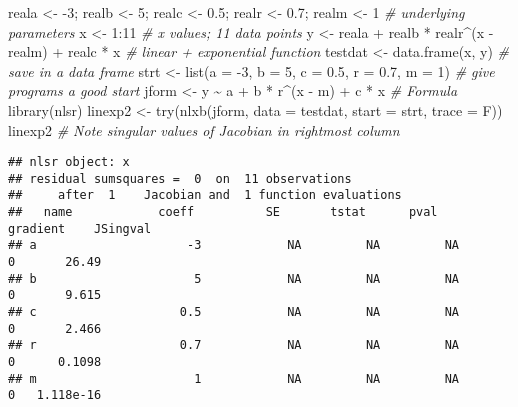 \documentclass[
]{article}
\newenvironment{Shaded}{\begin{snugshade}}{\end{snugshade}}
\newcommand{\AttributeTok}[1]{\textcolor[rgb]{0.77,0.63,0.00}{#1}}
\newcommand{\CommentTok}[1]{\textcolor[rgb]{0.56,0.35,0.01}{\textit{#1}}}
\newcommand{\DecValTok}[1]{\textcolor[rgb]{0.00,0.00,0.81}{#1}}
\newcommand{\FloatTok}[1]{\textcolor[rgb]{0.00,0.00,0.81}{#1}}
\newcommand{\FunctionTok}[1]{\textcolor[rgb]{0.00,0.00,0.00}{#1}}
\newcommand{\NormalTok}[1]{#1}
\newcommand{\OtherTok}[1]{\textcolor[rgb]{0.56,0.35,0.01}{#1}}
\newcommand{\SpecialCharTok}[1]{\textcolor[rgb]{0.00,0.00,0.00}{#1}}
\begin{document}
\begin{Shaded}
\begin{Highlighting}[]
\NormalTok{reala }\OtherTok{\textless{}{-}} \SpecialCharTok{{-}}\DecValTok{3}\NormalTok{; realb }\OtherTok{\textless{}{-}} \DecValTok{5}\NormalTok{; realc }\OtherTok{\textless{}{-}} \FloatTok{0.5}\NormalTok{; realr }\OtherTok{\textless{}{-}} \FloatTok{0.7}\NormalTok{; realm }\OtherTok{\textless{}{-}} \DecValTok{1} \CommentTok{\# underlying parameters}
\NormalTok{x }\OtherTok{\textless{}{-}} \DecValTok{1}\SpecialCharTok{:}\DecValTok{11} \CommentTok{\# x values; 11 data points}
\NormalTok{y }\OtherTok{\textless{}{-}}\NormalTok{ reala }\SpecialCharTok{+}\NormalTok{ realb }\SpecialCharTok{*}\NormalTok{ realr}\SpecialCharTok{\^{}}\NormalTok{(x }\SpecialCharTok{{-}}\NormalTok{ realm) }\SpecialCharTok{+}\NormalTok{ realc }\SpecialCharTok{*}\NormalTok{ x }\CommentTok{\# linear + exponential function}
\NormalTok{testdat }\OtherTok{\textless{}{-}} \FunctionTok{data.frame}\NormalTok{(x, y) }\CommentTok{\# save in a data frame}
\NormalTok{strt }\OtherTok{\textless{}{-}} \FunctionTok{list}\NormalTok{(}\AttributeTok{a =} \SpecialCharTok{{-}}\DecValTok{3}\NormalTok{, }\AttributeTok{b =} \DecValTok{5}\NormalTok{, }\AttributeTok{c =} \FloatTok{0.5}\NormalTok{, }\AttributeTok{r =} \FloatTok{0.7}\NormalTok{, }\AttributeTok{m =} \DecValTok{1}\NormalTok{) }\CommentTok{\# give programs a good start}
\NormalTok{jform }\OtherTok{\textless{}{-}}\NormalTok{ y }\SpecialCharTok{\textasciitilde{}}\NormalTok{ a }\SpecialCharTok{+}\NormalTok{ b }\SpecialCharTok{*}\NormalTok{ r}\SpecialCharTok{\^{}}\NormalTok{(x }\SpecialCharTok{{-}}\NormalTok{ m) }\SpecialCharTok{+}\NormalTok{ c }\SpecialCharTok{*}\NormalTok{ x }\CommentTok{\# Formula}
\FunctionTok{library}\NormalTok{(nlsr)}
\NormalTok{linexp2 }\OtherTok{\textless{}{-}} \FunctionTok{try}\NormalTok{(}\FunctionTok{nlxb}\NormalTok{(jform, }\AttributeTok{data =}\NormalTok{ testdat, }\AttributeTok{start =}\NormalTok{ strt, }\AttributeTok{trace =}\NormalTok{ F))}
\NormalTok{linexp2 }\CommentTok{\# Note singular values of Jacobian in rightmost column}
\end{Highlighting}
\end{Shaded}

\begin{verbatim}
## nlsr object: x 
## residual sumsquares =  0  on  11 observations
##     after  1    Jacobian and  1 function evaluations
##   name            coeff          SE       tstat      pval      gradient    JSingval   
## a                     -3            NA         NA         NA           0       26.49  
## b                      5            NA         NA         NA           0       9.615  
## c                    0.5            NA         NA         NA           0       2.466  
## r                    0.7            NA         NA         NA           0      0.1098  
## m                      1            NA         NA         NA           0   1.118e-16
\end{verbatim}
\end{document}
